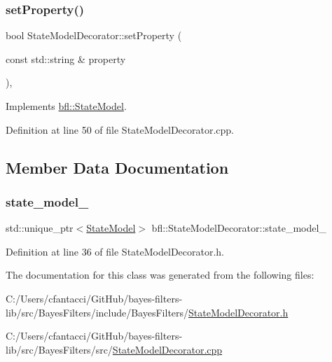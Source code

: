 \subsubsection{\texorpdfstring{set\+Property()}{setProperty()}}
{\footnotesize\ttfamily bool State\+Model\+Decorator\+::set\+Property (\begin{DoxyParamCaption}\item[{const std\+::string \&}]{property }\end{DoxyParamCaption})\hspace{0.3cm}{\ttfamily [override]}, {\ttfamily [virtual]}}



Implements \mbox{\hyperlink{classbfl_1_1StateModel_ac86dcdad8f0bbfab39a23e592779feaa}{bfl\+::\+State\+Model}}.



Definition at line 50 of file State\+Model\+Decorator.\+cpp.



\subsection{Member Data Documentation}
\mbox{\label{classbfl_1_1StateModelDecorator_acd7df6c203047dfa16ef78dd34c1b769}} 
\subsubsection{\texorpdfstring{state\+\_\+model\+\_\+}{state\_model\_}}
{\footnotesize\ttfamily std\+::unique\+\_\+ptr$<$\mbox{\hyperlink{classbfl_1_1StateModel}{State\+Model}}$>$ bfl\+::\+State\+Model\+Decorator\+::state\+\_\+model\+\_\+\hspace{0.3cm}{\ttfamily [private]}}



Definition at line 36 of file State\+Model\+Decorator.\+h.



The documentation for this class was generated from the following files\+:\begin{DoxyCompactItemize}
\item 
C\+:/\+Users/cfantacci/\+Git\+Hub/bayes-\/filters-\/lib/src/\+Bayes\+Filters/include/\+Bayes\+Filters/\mbox{\hyperlink{StateModelDecorator_8h}{State\+Model\+Decorator.\+h}}\item 
C\+:/\+Users/cfantacci/\+Git\+Hub/bayes-\/filters-\/lib/src/\+Bayes\+Filters/src/\mbox{\hyperlink{StateModelDecorator_8cpp}{State\+Model\+Decorator.\+cpp}}\end{DoxyCompactItemize}
